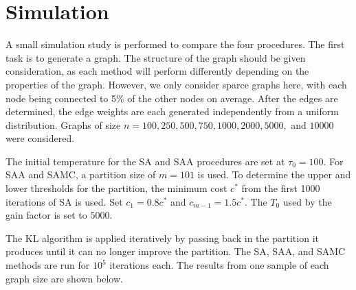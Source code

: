 \documentclass[11pt,]{article}
\begin{document}
\vspace{2pc}

\section{Simulation}\label{simulation}

A small simulation study is performed to compare the four procedures.
The first task is to generate a graph. The structure of the graph should
be given consideration, as each method will perform differently
depending on the properties of the graph. However, we only consider
sparce graphs here, with each node being connected to 5\% of the other
nodes on average. After the edges are determined, the edge weights are
each generated independently from a uniform distribution. Graphs of size
\(n = 100, 250, 500, 750, 1000, 2000, 5000,\) and \(10000\) were
considered.

The initial temperature for the SA and SAA procedures are set at
\(\tau_0 = 100\). For SAA and SAMC, a partition size of \(m = 101\) is
used. To determine the upper and lower thresholds for the partition, the
minimum cost \(c^*\) from the first 1000 iterations of SA is used. Set
\(c_1 = 0.8c^*\) and \(c_{m - 1}=1.5c^*\). The \(T_0\) used by the gain
factor is set to \(5000\).

The KL algorithm is applied iteratively by passing back in the partition
it produces until it can no longer improve the partition. The SA, SAA,
and SAMC methods are run for \(10^5\) iterations each. The results from
one sample of each graph size are shown below.
\end{document}

